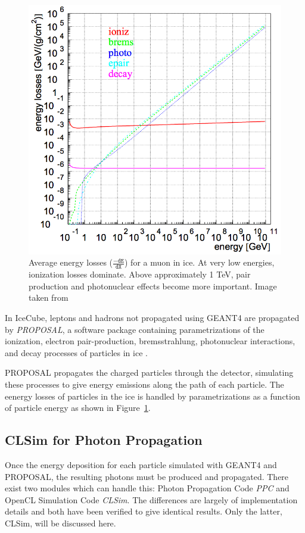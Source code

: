 \begin{figure}
\centering
\includegraphics[width=0.6\linewidth]{discrete_emissions_MMC.png}
\caption[Energy losses for a muon in ice]{Average energy losses ($\mathtt{\frac{-dE}{dX}}$) for a muon in ice. At very low energies, ionization losses dominate. Above approximately 1 TeV, pair production and photonuclear effects become more important. Image taken from \cite{Dima-MMC}}
\label{fig:discrete_emissions}
\end{figure}

In IceCube, leptons and hadrons not propagated using GEANT4 are propagated by \emph{PROPOSAL}, a software package containing parametrizations of the ionization, electron pair-production, bremsstrahlung, photonuclear interactions, and decay processes of particles in ice \cite{PROPOSAL}.

PROPOSAL propagates the charged particles through the detector, simulating these processes to give energy emissions along the path of each particle.
The eenergy losses of particles  in the ice is handled by parametrizations as a function of particle energy as shown in Figure~\ref{fig:discrete_emissions}.


\subsection{CLSim for Photon Propagation}
\label{subsec:clsim}
Once the energy deposition for each particle simulated with GEANT4 and PROPOSAL, the resulting photons must be produced and propagated. 
There exist two modules which can handle this: Photon Propagation Code \emph{PPC} and OpenCL Simulation Code \emph{CLSim}. 
The differences are largely of implementation details and both have been verified to give identical results.
Only the latter, CLSim, will be discussed here.

